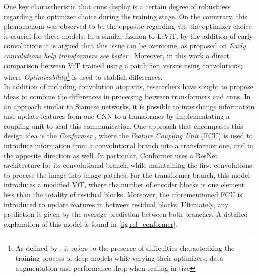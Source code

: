 \noindent One key charactheristic that \glspl{cnn} display is a certain degree of robustness 
regarding the optimizer choice during the training stage. On the countrary, this phenomenom was 
observed to be the opposite regarding \gls{vit}, the optimizer choice is crucial for these 
models. In a similar fashion to LeViT, by the addition of early convolutions it is argued that 
this issue can be overcome, as proposed on \emph{Early convolutions help transformers see 
better} \autocite{xiao2021early}. Moreover, in this work a direct comparison between ViT trained 
using a patchifier, versus using convolutions; where \emph{Optimizability}\footnote{As defined by 
\cite{xiao2021early}, it refers to the presence of difficulties characterizing the training 
process of deep models while varying their optimizers, data augmentation and performance drop 
when scaling in size} is used to stablish differences.\\



\noindent In addition of including convolution atop \glspl{vit}, researchers have sought to propose 
ideas to combine the differences in processing between transformers and \glspl{cnn}. In an 
approach similar to Siamese networks, it is possible to interchange information and update 
features from one CNN to a transformer by implementating a coupling unit to lead this 
communication. One approach that encompases this design idea is the \emph{Conformer} \autocite{
peng2021conformer}, where the \emph{Feature Coupling Unit} (FCU) is used to introduce information 
from a convolutional branch into a transformer one, and in the opposite direction as well. In 
particular, Conformer uses a ResNet architecture for its convolutional branch, while 
maintaining the first convolutions to process the image into image patches. For the transformer 
branch, this model introduces a modified ViT, where the number of encoder blocks is one element 
less than the totality of residual blocks. Moreover, the aforementioned FCU is introduced to update 
features in between residual blocks. Ultimately, any prediction is given by the average prediction 
between both branches. A detailed explanation of this model is found in \autoref{fig:rel_conformer}.